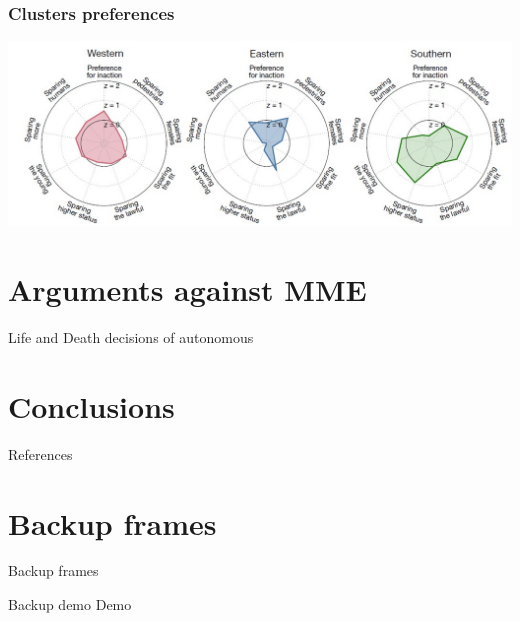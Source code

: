 \documentclass[aspectratio=169]{beamer}
\begin{document}
\begin{frame}
    \frametitle{Clusters preferences}
    \includegraphics{assets/clusters-mme.jpg}
\end{frame}

\section{Arguments against MME}
\begin{frame}
    Life and Death decisions of autonomous
\end{frame}

\section{Conclusions}
\begin{frame}
    \cite{mme}
\end{frame}

\appendix
\begin{frame}{References}
    \printbibliography
\end{frame}

\section*{Backup frames}
\begin{frame}
    \centering
    \vfill
    {\fontsize{40}{50}\selectfont Backup frames}
    \vfill
\end{frame}

\begin{frame}{Backup demo}
    Demo
\end{frame}
\end{document}
